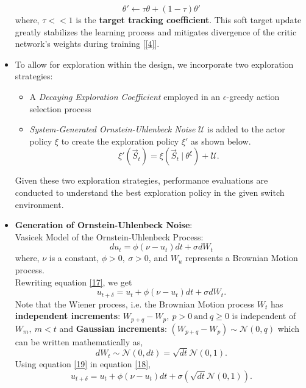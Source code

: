 \documentclass{article}
\begin{document}
\begin{itemize}
    \begin{equation}
        \theta' \longleftarrow \tau \theta + (1 - \tau) \theta'
    \end{equation}
    where, $\tau << 1$ is the \textbf{target tracking coefficient}. This soft target update greatly stabilizes the learning process and mitigates divergence of the critic network's weights during training [\ref{4}].
    \item To allow for exploration within the design, we incorporate two exploration strategies:
    \begin{itemize}
        \item A \textit{Decaying Exploration Coefficient} employed in an $\epsilon$-greedy action selection process
        \item \textit{System-Generated Ornstein-Uhlenbeck Noise} $\mathcal{U}$ is added to the actor policy $\xi$ to create the exploration policy $\xi'$ as shown below.
        \begin{equation}
            \xi'(\vec{S}_t) = \xi(\vec{S}_t\ |\ \theta^{\xi}) + \mathcal{U}.
        \end{equation}
    \end{itemize}
    Given these two exploration strategies, performance evaluations are conducted to understand the best exploration policy in the given switch environment.
    \item \textbf{Generation of Ornstein-Uhlenbeck Noise}:
    \\Vasicek Model of the Ornstein-Uhlenbeck Process:
    \begin{equation}\label{17}
        du_{t} = \phi(\nu - u_{t}) dt + \sigma dW_{t}
    \end{equation}
    where, $\nu$ is a constant, $\phi > 0,\ \sigma > 0$, and $W_u$ represents a Brownian Motion process.
    \\Rewriting equation \eqref{17}, we get
    \begin{equation}\label{18}
        u_{t+\delta} = u_{t} + \phi(\nu - u_{t}) dt + \sigma dW_{t}.
    \end{equation}
    Note that the Wiener process, i.e. the Brownian Motion process $W_t$ has \textbf{independent increments}: $W_{p+q} - W_{p},\ p > 0\ \text{and}\ q \geq 0$ is independent of $W_{m},\ m < t$ and \textbf{Gaussian increments}: $(W_{p+q} - W_p) \sim \mathcal{N}(0, q)$ which can be written mathematically as,
    \begin{equation}\label{19}
        dW_{t} \sim \mathcal{N}(0, dt) = \sqrt{dt} \mathcal{N}(0, 1).
    \end{equation}
    Using equation \eqref{19} in equation \eqref{18},
    \begin{equation}
        u_{t+\delta} = u_{t} + \phi(\nu - u_{t}) dt + \sigma(\sqrt{dt} \mathcal{N}(0, 1)).
    \end{equation}
\end{itemize}
\end{document}
